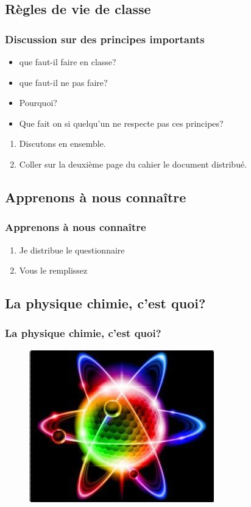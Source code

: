 \documentclass{beamer}
\begin{document}
\subsection{Règles de vie de classe}
\begin{frame}
\frametitle{Discussion sur des principes importants}
\begin{itemize}
    \item que faut-il faire en classe?
    \item que faut-il ne pas faire?
    \item Pourquoi?
    \item Que fait on si quelqu'un ne respecte pas ces principes?
\end{itemize}

\begin{enumerate}
    \item Discutons en ensemble.
    \item Coller sur la deuxième page du cahier le document distribué.
\end{enumerate}
\end{frame}


\subsection{Apprenons à nous connaître}
\begin{frame}
\frametitle{Apprenons à nous connaître}
\begin{enumerate}
    \item Je distribue le questionnaire
    \item Vous le remplissez 
\end{enumerate}
\end{frame}

\subsection{La physique chimie, c'est quoi?}
    \begin{frame}
    \frametitle{La physique chimie, c'est quoi?}
    \begin{figure}
        \includegraphics[width=0.8\linewidth]{atome.jpg}
    \end{figure}
    \end{frame}
\end{document}
